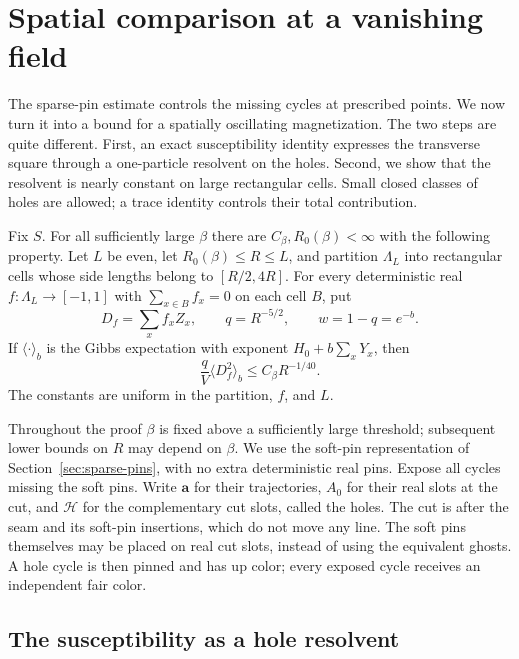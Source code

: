 \section{Spatial comparison at a vanishing field}\label{sec:weak-field}
\label{sec:spatial-comparison}

The sparse-pin estimate controls the missing cycles at prescribed
points.  We now turn it into a bound for a spatially oscillating
magnetization.  The two steps are quite different.  First, an exact
susceptibility identity expresses the transverse square through a
one-particle resolvent on the holes.  Second, we show that the resolvent
is nearly constant on large rectangular cells.  Small closed classes of
holes are allowed; a trace identity controls their total contribution.

\begin{proposition}\label{prop:weak-field}
Fix $S$.  For all sufficiently large $\beta$ there are
$C_\beta,R_0(\beta)<\infty$ with the following property.  Let $L$ be
even, let $R_0(\beta)\le R\le L$, and partition $\Lambda_L$ into
rectangular cells whose side lengths belong to $[R/2,4R]$.  For every
deterministic real $f:\Lambda_L\to[-1,1]$ with
$\sum_{x\in B}f_x=0$ on each cell $B$, put
\[
 D_f=\sum_x f_x Z_x,\qquad q=R^{-5/2},\qquad
 w=1-q=e^{-b}.
\]
If $\langle\cdot\rangle_b$ is the Gibbs expectation with exponent
$H_0+b\sum_xY_x$, then
\begin{equation}\label{eq:weak-field}
 \frac qV\langle D_f^2\rangle_b\le C_\beta R^{-1/40}.
\end{equation}
The constants are uniform in the partition, $f$, and $L$.
\end{proposition}

Throughout the proof $\beta$ is fixed above a sufficiently large
threshold; subsequent lower bounds on $R$ may depend on $\beta$.
We use the soft-pin representation of Section~\ref{sec:sparse-pins},
with no extra deterministic real pins.  Expose all cycles missing the
soft pins.  Write $\mathbf a$ for their trajectories, $A_0$ for their
real slots at the cut, and $\mathcal H$ for the complementary cut
slots, called the holes.  The cut is after the seam and its soft-pin
insertions, which do not move any line.
The soft pins themselves may be placed on real cut slots, instead of
using the equivalent ghosts.  A hole cycle is then pinned and has up
color; every exposed cycle receives an independent fair color.

\subsection{The susceptibility as a hole resolvent}

